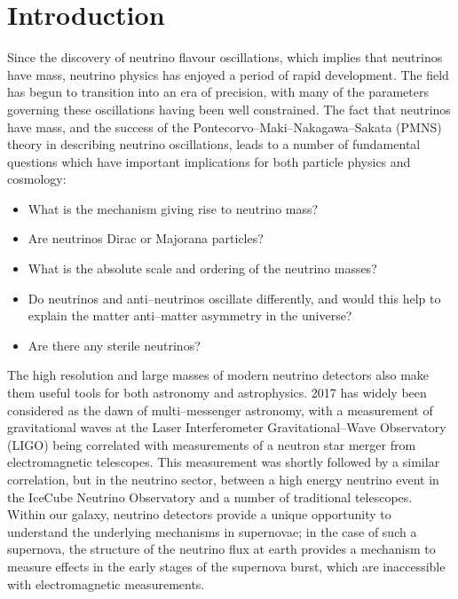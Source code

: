 \chapter{\label{ch:intro}Introduction} 

\minitoc

Since the discovery of neutrino flavour oscillations, which implies that
neutrinos have mass, neutrino physics has enjoyed a period of rapid development.
The field has begun to transition into an era of precision, with many of the
parameters governing these oscillations having been well constrained. The fact
that neutrinos have mass, and the success of the
Pontecorvo--Maki--Nakagawa--Sakata (PMNS) theory in describing neutrino 
oscillations, leads to a number of fundamental questions which have important 
implications for both particle physics and cosmology: 
\begin{itemize}
	\item What is the mechanism giving rise to neutrino mass? 
	\item Are neutrinos Dirac or Majorana particles?
	\item What is the absolute scale and ordering of the neutrino masses?
	\item Do neutrinos and anti--neutrinos oscillate differently, and would this 
	      help to explain the matter anti--matter asymmetry in the universe?
	\item Are there any sterile neutrinos?
\end{itemize}

The high resolution and large masses of modern neutrino detectors also
make them useful tools for both astronomy and astrophysics. 2017 has widely 
been considered as the dawn of multi--messenger astronomy, with a measurement 
of gravitational waves at the Laser Interferometer Gravitational--Wave 
Observatory (LIGO) being correlated with measurements of a neutron star merger 
from electromagnetic telescopes\cite{Abbott2017}.  This measurement was 
shortly followed by a similar correlation, but in the neutrino sector, between a
high energy neutrino event in the IceCube Neutrino Observatory and a number of 
traditional telescopes\cite{Aartsen2018}.  Within our galaxy, neutrino 
detectors provide a unique opportunity to understand the underlying mechanisms 
in supernovae; in the case of such a supernova, the structure of the neutrino 
flux at earth provides a mechanism to measure effects in the early stages of 
the supernova burst, which are inaccessible with electromagnetic 
measurements\cite{Scholberg:2012id}.

